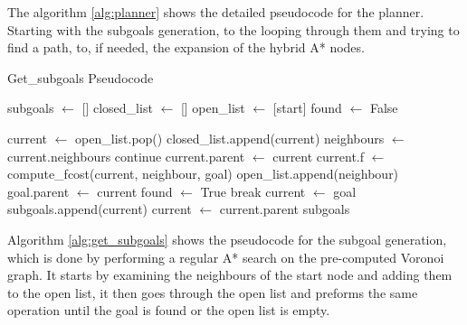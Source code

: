 The algorithm \ref{alg:planner} shows the detailed pseudocode for the planner. Starting 
with the subgoals generation, to the looping through them and trying to find a path, 
to, if needed, the expansion of the hybrid A* nodes.
\begin{algorithm}[h]
\caption{Get\_subgoals Pseudocode}
\label{alg:get_subgoals}
\begin{algorithmic}[1]
    \State subgoals $\gets$ []
    \State closed\_list $\gets$ []
    \State open\_list $\gets$ [start]
    \State found $\gets$ False

        \State current $\gets$ open\_list.pop()
        \State closed\_list.append(current)
        \State neighbours $ \gets$ current.neighbours
                        \State continue
                    \EndIf
                \EndIf
                \State current.parent $\gets$ current
                \State current.f $\gets$ compute\_fcost(current, neighbour, goal)
                \State open\_list.append(neighbour)
            \EndIf
                \State goal.parent $\gets$ current 
                \State found $\gets$ True
                break
            \EndIf
        \EndFor
    \EndWhile
        \State current $\gets$ goal
            \State subgoals.append(current)
            \State current $\gets$ current.parent
        \EndWhile
    \EndIf
    \State \Return subgoals
\EndFunction
\end{algorithmic}
\end{algorithm}

Algorithm \ref{alg:get_subgoals} shows the pseudocode for the subgoal generation, 
which is done by performing a regular A* search on the pre-computed Voronoi graph. 
It starts by examining the neighbours of the start node and adding them 
to the open list, it then goes through the open list and preforms the 
same operation until the goal is found or the open list is empty.

